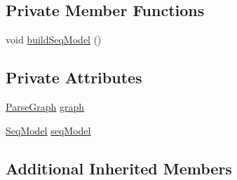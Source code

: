 \subsection*{Private Member Functions}
\begin{DoxyCompactItemize}
\item 
void \hyperlink{class_h_m_m_seq_recognition_afe35a34d7f03bb857683f0db7e0593a8}{build\+Seq\+Model} ()
\end{DoxyCompactItemize}
\subsection*{Private Attributes}
\begin{DoxyCompactItemize}
\item 
\hyperlink{class_parse_graph}{Parse\+Graph} \hyperlink{class_h_m_m_seq_recognition_a7102c5c76a993fd7ecaa84398c5fc524}{graph}
\item 
\hyperlink{class_seq_model}{Seq\+Model} \hyperlink{class_h_m_m_seq_recognition_a36ede5e827ea9429c0997ef78726941f}{seq\+Model}
\end{DoxyCompactItemize}
\subsection*{Additional Inherited Members}


